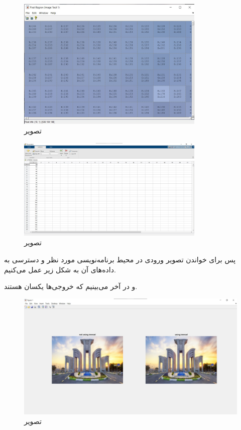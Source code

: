 \documentclass{article}
\begin{document}
\begin{figure}[H]
    \centering
    \includegraphics[width=0.8\textwidth]{figures/1b.jpg}
    \caption
	{
تصویر
	}
    \label{fig:fig1}
\end{figure}
\begin{figure}[H]
    \centering
    \includegraphics[width=0.8\textwidth]{figures/1c.jpg}
    \caption
	{
تصویر
	}
    \label{fig:fig1}
\end{figure}
پس برای خواندن تصویر ورودی در محیط برنامه‌نویسی مورد نظر و دسترسی به داده‌های آن به شکل زیر عمل می‌کنیم.
\begin{latin}

\end{latin}
و در آخر می‌بینیم که خروجی‌ها یکسان هستند.
\begin{figure}[H]
    \centering
    \includegraphics[width=1\textwidth]{figures/1d.jpg}
    \caption
	{
تصویر
	}
    \label{fig:fig1}
\end{figure}
\end{document}
